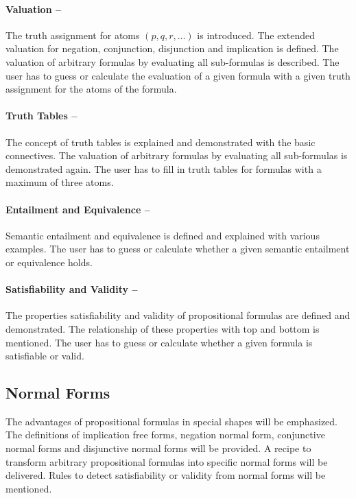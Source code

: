 \paragraph{Valuation – }
\label{tut:31}
The truth assignment for atoms $(p,q,r,…)$ is introduced. 
The extended valuation for negation, conjunction, disjunction and implication is defined.
The valuation of arbitrary formulas by evaluating all sub-formulas is described.
The user has to guess or calculate the evaluation of a given formula with a given truth assignment for the atoms of the formula.

\paragraph{Truth Tables – }
\label{tut:32}
The concept of truth tables is explained and demonstrated with the basic connectives. 
The valuation of arbitrary formulas by evaluating all sub-formulas is demonstrated again.
The user has to fill in truth tables for formulas with a maximum of three atoms.

\paragraph{Entailment and Equivalence – }
\label{tut:33}
Semantic entailment and equivalence is defined and explained with various examples.
The user has to guess or calculate whether a given semantic entailment or equivalence holds. 

\paragraph{Satisfiability and Validity – }
\label{tut:34}
The properties satisfiability and validity of propositional formulas are defined and demonstrated. 
The relationship of these properties with top and bottom is mentioned. 
The user has to guess or calculate whether a given formula is satisfiable or valid.

\subsection{Normal Forms}

The advantages of propositional formulas in special shapes will be emphasized.
The definitions of implication free forms, negation normal form, 
conjunctive normal forms and disjunctive normal forms will be provided. 
A recipe to transform arbitrary propositional formulas into specific normal forms will be delivered.
Rules to detect satisfiability or validity from normal forms will be mentioned.

